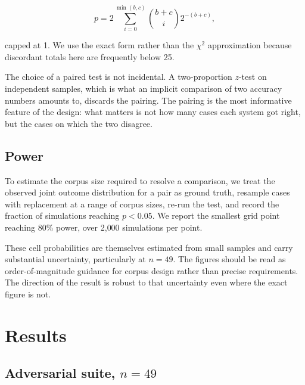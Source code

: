 \documentclass[11pt]{article}
\begin{document}
\begin{equation}
p = 2 \sum_{i=0}^{\min(b,c)} \binom{b+c}{i} 2^{-(b+c)},
\end{equation}

capped at 1. We use the exact form rather than the $\chi^2$ approximation because
discordant totals here are frequently below 25.

The choice of a paired test is not incidental. A two-proportion $z$-test on
independent samples, which is what an implicit comparison of two accuracy numbers
amounts to, discards the pairing. The pairing is the most informative feature of
the design: what matters is not how many cases each system got right, but the
cases on which the two disagree.

\subsection{Power}

To estimate the corpus size required to resolve a comparison, we treat the
observed joint outcome distribution for a pair as ground truth, resample cases
with replacement at a range of corpus sizes, re-run the test, and record the
fraction of simulations reaching $p < 0.05$. We report the smallest grid point
reaching 80\% power, over 2{,}000 simulations per point.

These cell probabilities are themselves estimated from small samples and carry
substantial uncertainty, particularly at $n = 49$. The figures should be read as
order-of-magnitude guidance for corpus design rather than precise requirements.
The direction of the result is robust to that uncertainty even where the exact
figure is not.

\section{Results}

\subsection{Adversarial suite, \texorpdfstring{$n = 49$}{n = 49}}
\end{document}

